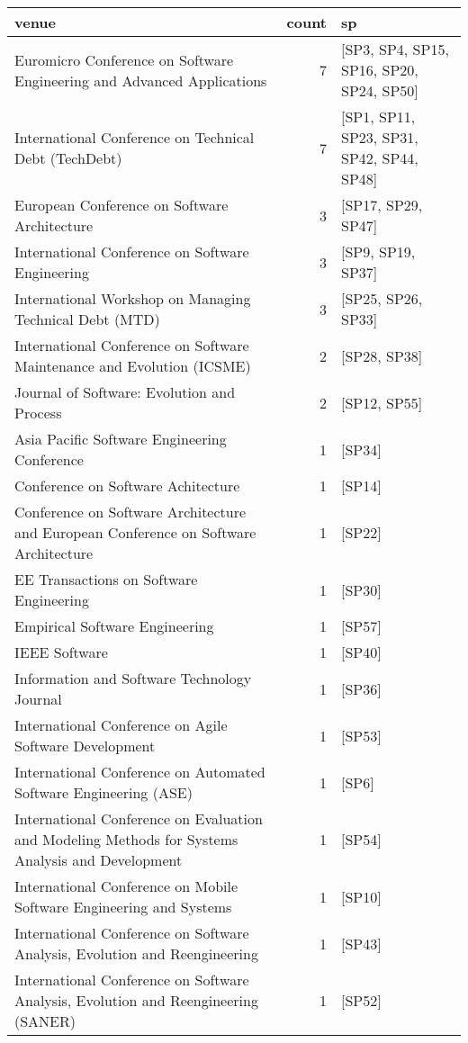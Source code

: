 \begin{tabular}{lrl}
\toprule
                                                                                            venue &  count &                                         sp \\
\midrule
 Euromicro Conference on Software Engineering and Advanced Applications &  7 &  [SP3, SP4, SP15, SP16, SP20, SP24, SP50] \\
 International Conference on Technical Debt (TechDebt) &  7 &  [SP1, SP11, SP23, SP31, SP42, SP44, SP48] \\
 European Conference on Software Architecture &  3 &  [SP17, SP29, SP47] \\
 International Conference on Software Engineering &  3 &  [SP9, SP19, SP37] \\
 International Workshop on Managing Technical Debt (MTD) &  3 &  [SP25, SP26, SP33] \\
 International Conference on Software Maintenance and Evolution (ICSME) &  2 &  [SP28, SP38] \\
 Journal of Software: Evolution and Process &  2 &  [SP12, SP55] \\
 Asia Pacific Software Engineering Conference &  1 &  [SP34] \\
 Conference on Software Achitecture &  1 &  [SP14] \\
 Conference on Software Architecture and European Conference on Software Architecture &  1 &  [SP22] \\
 EE Transactions on Software Engineering &  1 &  [SP30] \\
 Empirical Software Engineering &  1 &  [SP57] \\
 IEEE Software &  1 &  [SP40] \\
 Information and Software Technology Journal &  1 &  [SP36] \\
 International Conference on Agile Software Development &  1 &  [SP53] \\
 International Conference on Automated Software Engineering (ASE) &  1 &  [SP6] \\
 International Conference on Evaluation and Modeling Methods for Systems Analysis and Development &  1 &  [SP54] \\
 International Conference on Mobile Software Engineering and Systems &  1 &  [SP10] \\
 International Conference on Software Analysis, Evolution and Reengineering &  1 &  [SP43] \\
 International Conference on Software Analysis, Evolution and Reengineering (SANER) &  1 &  [SP52] \\

\end{tabular}
